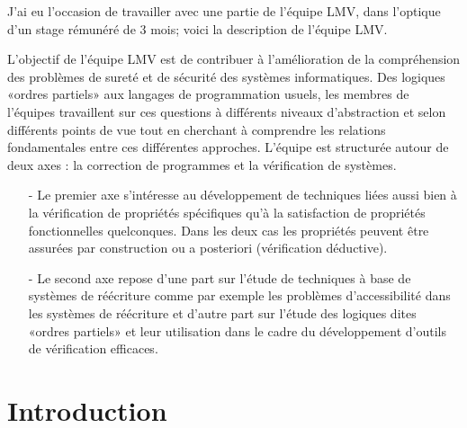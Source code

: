\documentclass[10pt,a4paper]{article}
\begin{document}
		J'ai eu l'occasion de travailler avec une partie de l'équipe LMV, dans l'optique d'un stage rémunéré de 3 mois; voici la description de l'équipe LMV.
		\medbreak
		
		L'objectif de l'équipe LMV est de contribuer à l'amélioration de la compréhension des problèmes de sureté et de sécurité des systèmes  informatiques. Des logiques «ordres partiels» aux langages de programmation usuels, les membres de l'équipes travaillent sur ces questions à différents niveaux d'abstraction et selon différents points de vue tout en cherchant à comprendre les relations fondamentales entre ces différentes approches. L'équipe est structurée autour de deux axes : la correction de programmes et la vérification de systèmes.
		\begin{enumerate}
			\item[-] Le premier axe s'intéresse au développement de techniques liées aussi bien à la vérification de propriétés spécifiques qu'à la satisfaction de propriétés fonctionnelles quelconques. Dans les deux cas les propriétés peuvent être assurées par construction ou a posteriori (vérification déductive).
			\item[-] Le second axe repose d'une part sur l'étude de techniques à base de systèmes de réécriture comme par exemple les problèmes d'accessibilité dans les systèmes de réécriture et d'autre part sur l'étude des logiques dites «ordres partiels» et leur utilisation dans le cadre du développement d'outils de vérification efficaces.
		\end{enumerate}
		\newpage
		
		
		
	\section{Introduction}

		
		
\end{document}
